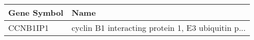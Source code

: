 \begin{tabular}{ll}
\toprule
Gene Symbol &                                               Name \\
\midrule
   CCNB1IP1 & cyclin B1 interacting protein 1, E3 ubiquitin p... \\
\bottomrule
\end{tabular}
